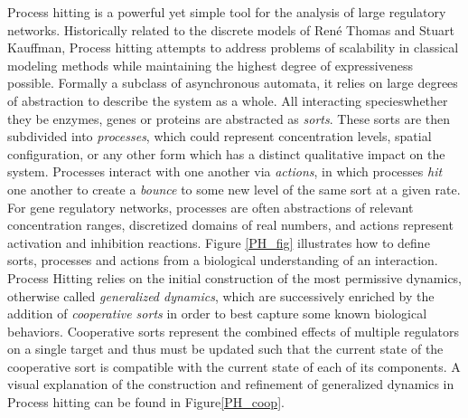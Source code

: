 \documentclass{article}
\begin{document}
Process hitting is a powerful yet simple tool for the analysis of large regulatory networks. Historically related to the discrete models of Ren\'{e} Thomas\cite{thomas1991regulatory} and Stuart Kauffman\cite{kauffman1969metabolic}, Process hitting attempts to address problems of scalability in classical modeling methods while maintaining the highest degree of expressiveness possible. Formally a subclass of asynchronous automata, it relies on large degrees of abstraction to describe the system as a whole. All interacting species\textemdash whether they be  enzymes, genes or proteins \textemdash are abstracted as \textit{sorts}. These sorts are then subdivided into \textit{processes}, which could represent concentration levels, spatial configuration, or any other form which has a distinct qualitative impact on the system. Processes interact with one another via \textit{actions}, in which processes \textit{hit} one another to create a \textit{bounce} to some new level of the same sort at a given rate. For gene regulatory networks, processes are often abstractions of relevant concentration ranges, discretized domains of real numbers, and actions represent activation and inhibition reactions. Figure \ref{PH_fig} illustrates how to define sorts, processes and actions from a biological understanding of an interaction. Process Hitting relies on the initial construction of the most permissive dynamics, otherwise called \textit{generalized dynamics}, which are successively enriched by the addition of \textit{cooperative sorts} in order to best capture some known biological behaviors. Cooperative sorts represent the combined effects of multiple regulators on a single target and thus must be updated such that the current state of the cooperative sort is compatible with the current state of each of its components. A visual explanation of the construction and refinement of generalized dynamics in Process hitting can be found in Figure\ref{PH_coop}.\\
\end{document}
